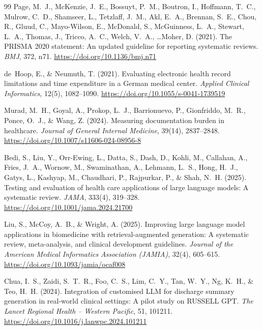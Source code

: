 \documentclass[CAT]{TFUOC}%
\begin{document}
\begin{thebibliography}{99}
Page, M.~J., McKenzie, J.~E., Bossuyt, P.~M., Boutron, I., Hoffmann, T.~C., Mulrow, C.~D., Shamseer, L., Tetzlaff, J.~M.,
Akl, E.~A., Brennan, S.~E., Chou, R., Gluud, C., Mayo-Wilson, E., McDonald, S., McGuinness, L.~A., Stewart, L.~A., Thomas, J.,
Tricco, A.~C., Welch, V.~A., \ldots Moher, D. (2021).
\newblock The PRISMA 2020 statement: An updated guideline for reporting systematic reviews.
\newblock \textit{BMJ}, 372, n71.
\newblock \url{https://doi.org/10.1136/bmj.n71}

de~Hoop, E., \& Neumuth, T. (2021).
\newblock Evaluating electronic health record limitations and time expenditure in a German medical center.
\newblock \textit{Applied Clinical Informatics}, 12(5), 1082--1090.
\newblock \url{https://doi.org/10.1055/s-0041-1739519}

Murad, M.~H., Goyal, A., Prokop, L.~J., Barrionuevo, P.,
Gionfriddo, M.~R., Ponce, O.~J., \& Wang, Z. (2024).
\newblock Measuring documentation burden in healthcare.
\newblock \textit{Journal of General Internal Medicine},
39(14), 2837--2848.
\newblock \url{https://doi.org/10.1007/s11606-024-08956-8}

Bedi, S., Liu, Y., Orr-Ewing, L., Datta, S., Dash, D.,
Kohli, M., Callahan, A., Fries, J.~A., Wornow, M.,
Swaminathan, A., Lehmann, L.~S., Hong, H.~J., Gatys, L.,
Kashyap, M., Chaudhari, P., Rajpurkar, P., \& Shah, N.~H.
(2025).
\newblock Testing and evaluation of health care applications
of large language models: A systematic review.
\newblock \textit{JAMA}, 333(4), 319--328.
\newblock \url{https://doi.org/10.1001/jama.2024.21700}

Liu, S., McCoy, A.~B., \& Wright, A. (2025).
\newblock Improving large language model applications in
biomedicine with retrieval-augmented generation: A systematic
review, meta-analysis, and clinical development guidelines.
\newblock \textit{Journal of the American Medical Informatics
Association (JAMIA)}, 32(4), 605--615.
\newblock \url{https://doi.org/10.1093/jamia/ocaf008}

Chua, I.~S., Zaidi, S.~T.~R., Foo, C.~S., Lim, C.~Y.,
Tan, W.~Y., Ng, K.~H., \& Teo, H.~H. (2024).
\newblock Integration of customised LLM for discharge summary
generation in real-world clinical settings: A pilot study
on RUSSELL GPT.
\newblock \textit{The Lancet Regional Health -- Western
Pacific}, 51, 101211.
\newblock \url{https://doi.org/10.1016/j.lanwpc.2024.101211}


\end{thebibliography}
\end{document}
